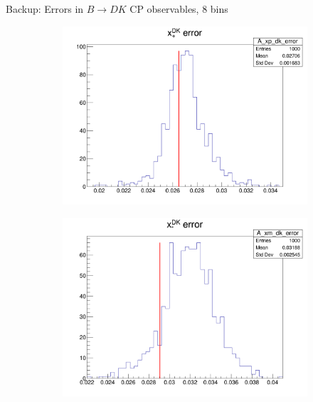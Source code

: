 \documentclass{beamer}
\begin{document}
\begin{frame}{Backup: Errors in $B\to DK$ CP observables, $8$ bins}
  \begin{figure}
    \centering
    \vspace{-0.2cm}
    \begin{subfigure}{0.42\textwidth}
      \includegraphics[width = 1.0\textwidth]{A_xp_dk_8Bins_error.png}
    \end{subfigure}%
    \begin{subfigure}{0.42\textwidth}
      \includegraphics[width = 1.0\textwidth]{A_xm_dk_8Bins_error.png}
    \end{subfigure}
    \begin{subfigure}{0.42\textwidth}

\end{subfigure}
\end{figure}
\end{frame}
\end{document}

